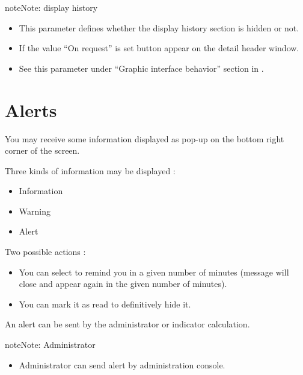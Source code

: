 \documentclass[letterpaper,10pt,english]{sphinxmanual}
\begin{document}
\begin{notice}{note}{Note:}
display history
\begin{itemize}
\item {} 
This parameter defines whether the display history section is hidden or not.

\item {} 
If the value ``On request'' is set  button appear on the detail header window.

\item {} 
See this parameter under ``Graphic interface behavior'' section in {\hyperref[UserParameter:user-parameters-label]{\emph{}}}.

\end{itemize}
\end{notice}
\newpage

\section{Alerts}
\label{Gui:alerts}
You may receive some information displayed as pop-up on the bottom right corner of the screen.

Three kinds of information may be displayed :
\begin{itemize}
\item {} 
Information

\item {} 
Warning

\item {} 
Alert

\end{itemize}

Two possible actions :
\begin{itemize}
\item {} 
You can select to remind you in a given number of minutes (message will close and appear  again in the given number of minutes).

\item {} 
You can mark it as read to definitively hide it.

\end{itemize}

An alert can be sent by the administrator or indicator calculation.

\begin{notice}{note}{Note:}
Administrator
\begin{itemize}
\item {} 
Administrator can send alert by administration console.

\end{itemize}
\end{notice}
\end{document}
